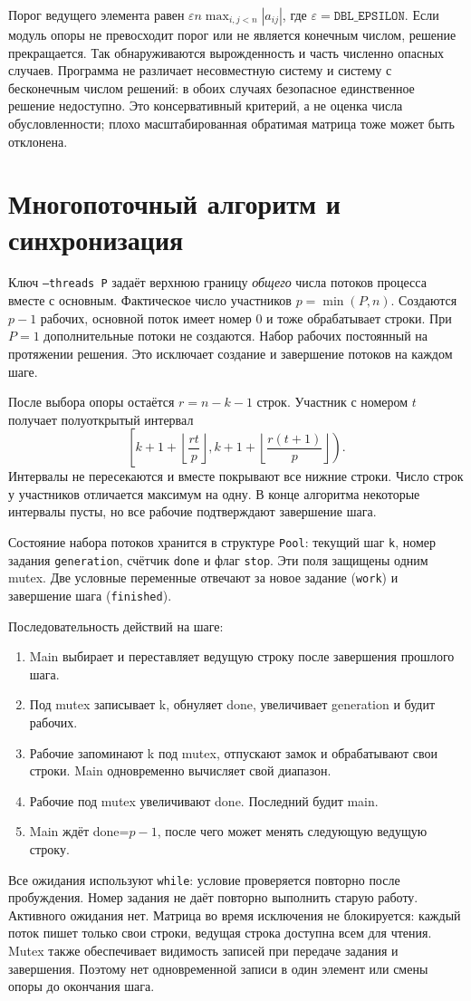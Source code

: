Порог ведущего элемента равен
$\varepsilon n\max_{i,j<n}|a_{ij}|$, где
$\varepsilon=\texttt{DBL\_EPSILON}$.
Если модуль опоры не превосходит порог или не является конечным числом,
решение прекращается. Так обнаруживаются вырожденность и часть численно
опасных случаев. Программа не различает несовместную систему и систему
с бесконечным числом решений: в обоих случаях безопасное единственное
решение недоступно. Это консервативный критерий, а не оценка числа
обусловленности; плохо масштабированная обратимая матрица тоже может быть отклонена.

\section{Многопоточный алгоритм и синхронизация}
Ключ \texttt{--threads P} задаёт верхнюю границу \emph{общего} числа потоков
процесса вместе с основным. Фактическое число участников $p=\min(P,n)$.
Создаются $p-1$ рабочих, основной поток имеет номер 0 и тоже обрабатывает строки.
При $P=1$ дополнительные потоки не создаются. Набор рабочих постоянный на
протяжении решения. Это исключает создание и завершение потоков на каждом шаге.

После выбора опоры остаётся $r=n-k-1$ строк. Участник с номером $t$ получает
полуоткрытый интервал
\[
\left[k+1+\left\lfloor\frac{rt}{p}\right\rfloor,
      k+1+\left\lfloor\frac{r(t+1)}{p}\right\rfloor\right).
\]
Интервалы не пересекаются и вместе покрывают все нижние строки. Число строк
у участников отличается максимум на одну. В конце алгоритма некоторые
интервалы пусты, но все рабочие подтверждают завершение шага.

Состояние набора потоков хранится в структуре \texttt{Pool}:
текущий шаг \texttt{k}, номер задания \texttt{generation}, счётчик
\texttt{done} и флаг \texttt{stop}. Эти поля защищены одним mutex.
Две условные переменные отвечают за новое задание (\texttt{work})
и завершение шага (\texttt{finished}).

Последовательность действий на шаге:
\begin{enumerate}[nosep]
\item Main выбирает и переставляет ведущую строку после завершения прошлого шага.
\item Под mutex записывает k, обнуляет done, увеличивает generation и будит рабочих.
\item Рабочие запоминают k под mutex, отпускают замок и обрабатывают свои строки.
Main одновременно вычисляет свой диапазон.
\item Рабочие под mutex увеличивают done. Последний будит main.
\item Main ждёт done=$p-1$, после чего может менять следующую ведущую строку.
\end{enumerate}
Все ожидания используют \texttt{while}: условие проверяется повторно после
пробуждения. Номер задания не даёт повторно выполнить старую работу.
Активного ожидания нет. Матрица во время исключения не блокируется:
каждый поток пишет только свои строки, ведущая строка доступна всем для чтения.
Mutex также обеспечивает видимость записей при передаче задания и завершения.
Поэтому нет одновременной записи в один элемент или смены опоры до окончания шага.

